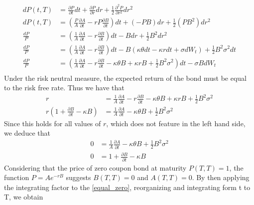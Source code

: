 \begin{align*}
    dP(t,T) &= \frac{\partial P}{\partial t} dt + \frac{\partial P}{\partial r} dr 
    + \frac{1}{2} \frac{\partial^2 P}{\partial r^2} dr^2 \\
    dP(t,T) &= \left( \frac{P}{A} \frac{\partial A}{\partial t} - rP \frac{\partial B}{\partial t} \right) dt 
    + (-PB) dr + \frac{1}{2} (PB^2) dr^2 \\
    \frac{dP}{P} &= \left( \frac{1}{A} \frac{\partial A}{\partial t} - r \frac{\partial B}{\partial t} \right) dt 
    - B dr + \frac{1}{2} B^2 dr^2 \\
    \frac{dP}{P} &= \left( \frac{1}{A} \frac{\partial A}{\partial t} - r \frac{\partial B}{\partial t} \right) dt
     - B(\kappa \theta dt - \kappa r dt + \sigma dW_t) + \frac{1}{2} B^2 \sigma^2 dt\\
    \frac{dP}{P} &= \left( \frac{1}{A} \frac{\partial A}{\partial t} - r \frac{\partial B}{\partial t} 
    - \kappa \theta B + \kappa r B + \frac{1}{2} B^2 \sigma^2 \right) dt - \sigma B dW_t \\
\end{align*}
Under the risk neutral measure, the expected return of the bond must be equal to the risk free rate. Thus we have that
\begin{align*}
    r  &= \frac{1}{A} \frac{\partial A}{\partial t} - r \frac{\partial B}{\partial t} - \kappa \theta B 
    + \kappa r B + \frac{1}{2} B^2 \sigma^2  \\
    r \left( 1 + \frac{\partial B}{\partial t} - \kappa B \right) & =\frac{1}{A} \frac{\partial A}{\partial t} 
    - \kappa \theta B + \frac{1}{2} B^2 \sigma^2 
\end{align*}
Since this holds for all values of $r$, which does not feature in the left hand side, we deduce that
\begin{align}
    0 &= \frac{1}{A} \frac{\partial A}{\partial t} - \kappa \theta B + \frac{1}{2} B^2 \sigma^2 \nonumber\\
    0 &=1 + \frac{\partial B}{\partial t} - \kappa B \label{equal_zero}
\end{align}
Considering that the price of zero coupon bond at maturity $P(T,T)=1$, the function $P=A e^{-rB}$ suggests $B(T,T)=0$
and $A(T,T)=0$. By then applying the integrating factor to the \autoref{equal_zero}, reorganizing and integrating
form t to T, we obtain
